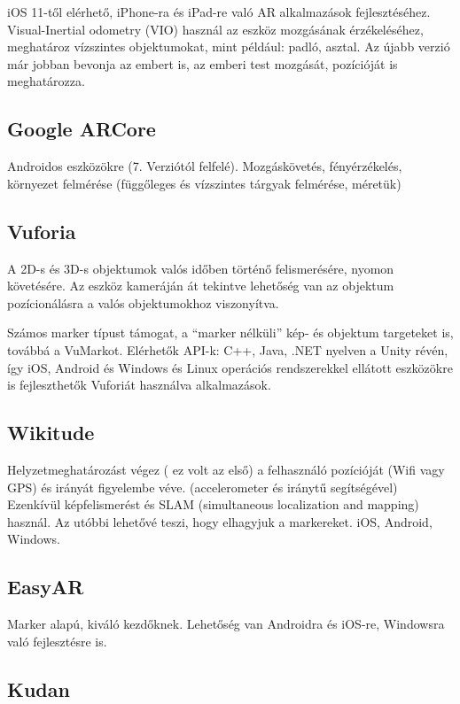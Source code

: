 \documentclass[a4paper,12pt]{article}
\begin{document}
iOS 11-től elérhető, iPhone-ra és iPad-re való AR alkalmazások fejlesztéséhez. Visual-Inertial odometry (VIO) használ az eszköz mozgásának érzékeléséhez, meghatároz vízszintes objektumokat, mint például: padló, asztal. Az újabb verzió már jobban bevonja az embert is, az emberi test mozgását, pozícióját is meghatározza.

\subsection{Google ARCore}

Androidos eszközökre (7. Verziótól felfelé).
Mozgáskövetés, fényérzékelés, környezet felmérése (függőleges és vízszintes tárgyak felmérése, méretük)

\subsection{Vuforia}

A 2D-s és 3D-s objektumok valós időben történő felismerésére, nyomon követésére. Az eszköz kameráján át tekintve lehetőség van az objektum pozícionálásra a valós objektumokhoz viszonyítva.

Számos marker típust támogat, a “marker nélküli” kép- és objektum targeteket is, továbbá a VuMarkot.
Elérhetők API-k: C++, Java, .NET nyelven a Unity révén, így iOS, Android és Windows és Linux operációs rendszerekkel ellátott eszközökre is fejleszthetők Vuforiát használva alkalmazások.

\subsection{Wikitude}

Helyzetmeghatározást végez ( ez volt az első) a felhasználó pozícióját (Wifi vagy GPS) és irányát figyelembe véve. (accelerometer és iránytű segítségével)
Ezenkívül képfelismerést és SLAM (simultaneous localization and mapping) használ. Az utóbbi lehetővé teszi, hogy elhagyjuk a markereket.
iOS, Android, Windows.

\subsection{EasyAR}

Marker alapú, kiváló kezdőknek. Lehetőség van Androidra és iOS-re, Windowsra való fejlesztésre is.

\subsection{Kudan}
\end{document}
